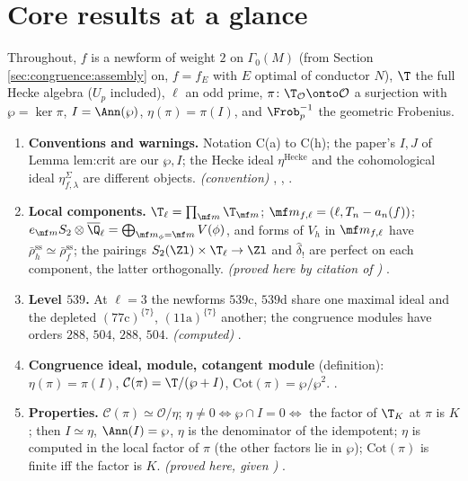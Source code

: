 \section*{Core results at a glance}

Throughout, $f$ is a newform of weight $2$ on $\Gamma_0(M)$ (from Section \ref{sec:congruence:assembly} on, $f=f_E$ with $E$ optimal of conductor $N$), $\T$ the full Hecke algebra ($U_p$ included), $\ell$ an odd
prime, $\pi\colon\T_{\mathcal O}\onto\mathcal O$ a surjection with $\wp=\ker\pi$, $I=\Ann(\wp)$, $\eta(\pi)=\pi(I)$, and $\Frob_p^{-1}$ the geometric Frobenius.

\begin{enumerate}[label=\textbf{\thechapter.\arabic*}]
\item \textbf{Conventions and warnings.} Notation C(a) to C(h); the paper's $I,J$ of Lemma lem:crit are our $\wp,I$; the Hecke ideal $\eta^{\mathrm{Hecke}}$ and the cohomological ideal $\eta^\Sigma_{f,\lambda}$ are
different objects. \emph{(convention)} , , .
\item \textbf{Local components.} $\T_\ell=\prod_{\mf m}\T_{\mf m}$; $\mf m_{f,\ell}=(\ell,T_n-a_n(f))$; $e_{\mf m}S_2\otimes\overline\Q_\ell=\bigoplus_{\mf m_\phi=\mf m}V(\phi)$, and forms of $V_h$ in $\mf m_{f,\ell}$ have $\bar\rho_h^{\mathrm{ss}}\simeq\bar\rho_f^{\mathrm{ss}}$; the pairings
$S_2(\Zl)\times\T_\ell\to\Zl$ and $\hat\delta_!$ are perfect on each component, the latter orthogonally. \emph{(proved here by citation of )} .
\item \textbf{Level $539$.} At $\ell=3$ the newforms $539$c, $539$d share one maximal ideal and the depleted $(77\mathrm c)^{\{7\}}$, $(11\mathrm a)^{\{7\}}$ another; the congruence modules have orders $288$, $504$, $288$, $504$.
\emph{(computed)} .
\item \textbf{Congruence ideal, module, cotangent module} (definition): $\eta(\pi)=\pi(I)$, $\mathcal C(\pi)=\T/(\wp+I)$, $\mathrm{Cot}(\pi)=\wp/\wp^2$. .
\item \textbf{Properties.} $\mathcal C(\pi)\simeq\mathcal O/\eta$; $\eta\ne0\iff\wp\cap I=0\iff$ the factor of $\T_K$ at $\pi$ is $K$; then $I\simeq\eta$, $\Ann(I)=\wp$, $\eta$ is the denominator of the idempotent; $\eta$ is computed in the
local factor of $\pi$ (the other factors lie in $\wp$); $\mathrm{Cot}(\pi)$ is finite iff the factor is $K$. \emph{(proved here, given )} .

\end{enumerate}
